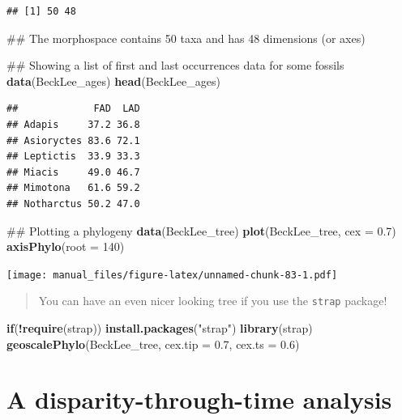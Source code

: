 \documentclass[]{book}
\newenvironment{Shaded}{\begin{snugshade}}{\end{snugshade}}
\newcommand{\KeywordTok}[1]{\textcolor[rgb]{0.13,0.29,0.53}{\textbf{#1}}}
\newcommand{\DataTypeTok}[1]{\textcolor[rgb]{0.13,0.29,0.53}{#1}}
\newcommand{\DecValTok}[1]{\textcolor[rgb]{0.00,0.00,0.81}{#1}}
\newcommand{\FloatTok}[1]{\textcolor[rgb]{0.00,0.00,0.81}{#1}}
\newcommand{\StringTok}[1]{\textcolor[rgb]{0.31,0.60,0.02}{#1}}
\newcommand{\ControlFlowTok}[1]{\textcolor[rgb]{0.13,0.29,0.53}{\textbf{#1}}}
\newcommand{\OperatorTok}[1]{\textcolor[rgb]{0.81,0.36,0.00}{\textbf{#1}}}
\newcommand{\NormalTok}[1]{#1}
\theoremstyle{definition}
\theoremstyle{definition}
\theoremstyle{remark}
\begin{document}
\begin{verbatim}
## [1] 50 48
\end{verbatim}

\begin{Shaded}
\begin{Highlighting}[]
\NormalTok{## The morphospace contains 50 taxa and has 48 dimensions (or axes)}

\NormalTok{## Showing a list of first and last occurrences data for some fossils}
\KeywordTok{data}\NormalTok{(BeckLee_ages)}
\KeywordTok{head}\NormalTok{(BeckLee_ages)}
\end{Highlighting}
\end{Shaded}

\begin{verbatim}
##             FAD  LAD
## Adapis     37.2 36.8
## Asioryctes 83.6 72.1
## Leptictis  33.9 33.3
## Miacis     49.0 46.7
## Mimotona   61.6 59.2
## Notharctus 50.2 47.0
\end{verbatim}

\begin{Shaded}
\begin{Highlighting}[]
\NormalTok{## Plotting a phylogeny}
\KeywordTok{data}\NormalTok{(BeckLee_tree)}
\KeywordTok{plot}\NormalTok{(BeckLee_tree, }\DataTypeTok{cex =} \FloatTok{0.7}\NormalTok{)}
\KeywordTok{axisPhylo}\NormalTok{(}\DataTypeTok{root =} \DecValTok{140}\NormalTok{)}
\end{Highlighting}
\end{Shaded}

\texttt{[image: manual\_files/figure-latex/unnamed-chunk-83-1.pdf]}

\begin{quote}
You can have an even nicer looking tree if you use the \texttt{strap}
package!
\end{quote}

\begin{Shaded}
\begin{Highlighting}[]
\ControlFlowTok{if}\NormalTok{(}\OperatorTok{!}\KeywordTok{require}\NormalTok{(strap)) }\KeywordTok{install.packages}\NormalTok{(}\StringTok{"strap"}\NormalTok{)}
\KeywordTok{library}\NormalTok{(strap)}
\KeywordTok{geoscalePhylo}\NormalTok{(BeckLee_tree, }\DataTypeTok{cex.tip =} \FloatTok{0.7}\NormalTok{, }\DataTypeTok{cex.ts =} \FloatTok{0.6}\NormalTok{)}
\end{Highlighting}
\end{Shaded}

\section{A disparity-through-time
analysis}\label{a-disparity-through-time-analysis}
\end{document}
